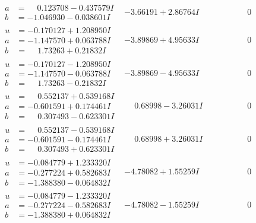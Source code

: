 \documentclass[1p]{elsarticle_modified}
\theoremstyle{definition}
\begin{document}
$$\begin{array}{c|c|c}
\begin{aligned}
a &= \phantom{-}0.123708 - 0.437579 I \\
b &= -1.046930 - 0.038601 I\end{aligned}
 & -3.66191 + 2.86764 I & \phantom{-0.000000 } 0 \\ \hline\begin{aligned}
u &= -0.170127 + 1.208950 I \\
a &= -1.147570 + 0.063788 I \\
b &= \phantom{-}1.73263 + 0.21832 I\end{aligned}
 & -3.89869 + 4.95633 I & \phantom{-0.000000 } 0 \\ \hline\begin{aligned}
u &= -0.170127 - 1.208950 I \\
a &= -1.147570 - 0.063788 I \\
b &= \phantom{-}1.73263 - 0.21832 I\end{aligned}
 & -3.89869 - 4.95633 I & \phantom{-0.000000 } 0 \\ \hline\begin{aligned}
u &= \phantom{-}0.552137 + 0.539168 I \\
a &= -0.601591 + 0.174461 I \\
b &= \phantom{-}0.307493 - 0.623301 I\end{aligned}
 & \phantom{-}0.68998 - 3.26031 I & \phantom{-0.000000 } 0 \\ \hline\begin{aligned}
u &= \phantom{-}0.552137 - 0.539168 I \\
a &= -0.601591 - 0.174461 I \\
b &= \phantom{-}0.307493 + 0.623301 I\end{aligned}
 & \phantom{-}0.68998 + 3.26031 I & \phantom{-0.000000 } 0 \\ \hline\begin{aligned}
u &= -0.084779 + 1.233320 I \\
a &= -0.277224 + 0.582683 I \\
b &= -1.388380 - 0.064832 I\end{aligned}
 & -4.78082 + 1.55259 I & \phantom{-0.000000 } 0 \\ \hline\begin{aligned}
u &= -0.084779 - 1.233320 I \\
a &= -0.277224 - 0.582683 I \\
b &= -1.388380 + 0.064832 I\end{aligned}
 & -4.78082 - 1.55259 I & \phantom{-0.000000 } 0 \\ \hline\begin{aligned}

\end{aligned}
\end{array}$$
\end{document}
